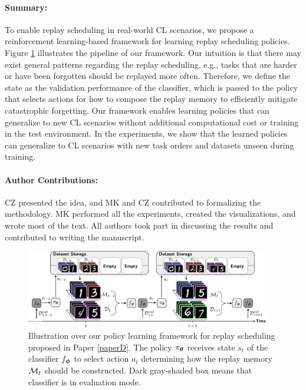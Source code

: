 \vspace{-3mm}
\paragraph{Summary:} To enable replay scheduling in real-world CL scenarios, we propose a reinforcement learning-based framework for learning replay scheduling policies. Figure \ref{fig:paperD_our_approach} illustrates the pipeline of our framework. Our intuition is that there may exist general patterns regarding the replay scheduling, e.g., tasks that are harder or have been forgotten should be replayed more often. Therefore, we define the state as the validation performance of the classifier, which is passed to the policy that selects actions for how to compose the replay memory to efficiently mitigate catastrophic forgetting. Our framework enables learning policies that can generalize to new CL scenarios without additional computational cost or training in the test environment. In the experiments, we show that the learned policies can generalize to CL scenarios with new task orders and datasets unseen during training. 

\vspace{-3mm}
\paragraph{Author Contributions:} CZ presented the idea, and MK and CZ contributed to formalizing the methodology. MK performed all the experiments, created the visualizations, and wrote most of the text. All authors took part in discussing the results and contributed to writing the manuscript. 

\begin{figure}[t]
	\centering 
	\includegraphics[width=0.95\textwidth]{Chapter1/figures/testing_size2.pdf}
	\caption{Illustration over our policy learning framework for replay scheduling proposed in Paper \ref{paperD}. The policy $\pi_{{\bm{\theta}}}$ receives state $s_t$ of the classifier $f_{{\bm{\phi}}}$ to select action $a_t$ determining how the replay memory ${\mathcal{M}}_t$ should be constructed. Dark gray-shaded box means that classifier is in evaluation mode.}
	\label{fig:paperD_our_approach}
	\vspace{-2mm}
\end{figure}

